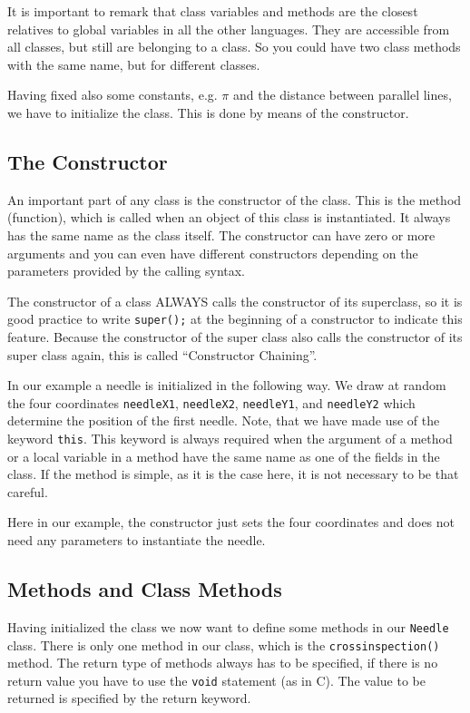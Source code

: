 It is important to remark that
class variables and methods are the closest relatives to global 
variables in all the other languages. They are accessible from all
classes, but still are belonging to a class. So you could have two
class methods with the same name, but for different classes.

Having fixed also some constants, e.g. $\pi$ and the distance between
parallel lines, we have to initialize the class. This is done by means
of the constructor.

\subsection{The Constructor}
An important part of any class is the constructor of the class. This is
the method (function), which is called when an object of this
class is instantiated. It always has the same name as the class itself.
The constructor can have zero or more arguments and you can even
have different constructors depending on the parameters provided by
the calling syntax.

The constructor of a class ALWAYS calls the constructor of its
superclass, so it is good practice to write \verb|super();| at the
beginning of a constructor to indicate this feature. Because the 
constructor of the super class also calls the constructor of its super
class again, this is called ``Constructor Chaining''.

In our example a needle is initialized in the following way. We draw
at random the four coordinates \verb|needleX1|, \verb|needleX2|,
\verb|needleY1|, and \verb|needleY2| which determine the position of
the first needle. Note, that we have made use of the keyword
\verb|this|.
This keyword is always required when the argument of a method
or a local variable in a method have the same name as one of the fields
in the class. If the method is simple, as it is the case here, it is
not necessary to be that careful.

Here in our example, the constructor just sets the four coordinates
and does not need any parameters to instantiate the needle.

\subsection{Methods and Class Methods}
Having initialized the class we now want to define some methods in our
\verb|Needle| class. There is only one method in our class, which
is the \verb|crossinspection()| method.
The return type of methods always has to be specified, if
there is no return value you have to use the \verb|void| statement
(as in C). The value to be returned is specified by the return keyword.

